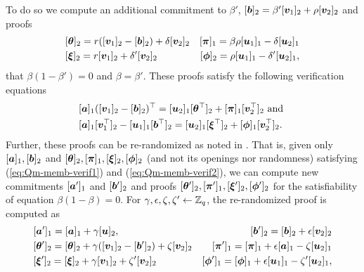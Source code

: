 To do so we compute an additional commitment to $\beta'$, $[{\boldsymbol{b}}]_2 = \beta'[{\boldsymbol{v}}_1]_2+\rho[{\boldsymbol{v}}_2]_2$ and proofs
\begin{align}
&[{\boldsymbol{\theta}}]_2 = r([{\boldsymbol{v}}_1]_2-[{\boldsymbol{b}}]_2)+\delta[{\boldsymbol{v}}_2]_2
&[{\boldsymbol{\pi}}]_1 = \beta\rho[{\boldsymbol{u}}_1]_1-\delta[{\boldsymbol{u}}_2]_1 \nonumber\\
&[{\boldsymbol{\xi}}]_2 = r[{\boldsymbol{v}}_1]_2+\delta'[{\boldsymbol{v}}_2]_2
&[{\boldsymbol{\phi}}]_2 = \rho[{\boldsymbol{u}}_1]_1 -\delta'[{\boldsymbol{u}}_2]_1,
\label{eq:Qm-memb-proofs}
\end{align}
that $\beta(1-\beta')=0$ and $\beta=\beta'$.
These proofs satisfy the following verification equations
\begin{align}
&[{\boldsymbol{a}}]_1([{\boldsymbol{v}}_1]_2-[{\boldsymbol{b}}]_2)^\top = [{\boldsymbol{u}}_2]_1[{\boldsymbol{\theta}}^\top]_2+[{\boldsymbol{\pi}}]_1[{\boldsymbol{v}}^\top_2]_2\text{ and } \label{eq:Qm-memb-verif1} \\
&[{\boldsymbol{a}}]_1[{\boldsymbol{v}}_1^\top]_2-[{\boldsymbol{u}}_1]_1[{\boldsymbol{b}}^\top]_2 = [{\boldsymbol{u}}_2]_1[{\boldsymbol{\xi}}^\top]_2 + [{\boldsymbol{\phi}}]_1[{\boldsymbol{v}}^\top_2]_2. \label{eq:Qm-memb-verif2}
\end{align}
Further, these proofs can be re-randomized as noted in \cite{C:BCCKLS09}. That is, given only $[{\boldsymbol{a}}]_1,[{\boldsymbol{b}}]_2$ and $[{\boldsymbol{\theta}}]_2,[{\boldsymbol{\pi}}]_1,[{\boldsymbol{\xi}}]_2,[{\boldsymbol{\phi}}]_2$ (and not its openings nor randomness) satisfying (\ref{eq:Qm-memb-verif1}) and (\ref{eq:Qm-memb-verif2}), we can compute new commitments $[{\boldsymbol{a}}']_1$ and $[{\boldsymbol{b}}']_2$ and proofs $[{\boldsymbol{\theta}}']_2,[{\boldsymbol{\pi}}']_1,[{\boldsymbol{\xi}}']_2,[{\boldsymbol{\phi}}']_2$ for the satisfiability of equation $\beta(1-\beta)=0$. For $\gamma,\epsilon,\zeta,\zeta'\gets\mathbb{Z}_q$, the re-randomized proof is computed as
\begin{align}
&[{\boldsymbol{a}}']_1 = [{\boldsymbol{a}}]_1 + \gamma[{\boldsymbol{u}}]_2, &[{\boldsymbol{b}}']_2 = [{\boldsymbol{b}}]_2 + \epsilon[{\boldsymbol{v}}_2]_2 \nonumber\\
&[{\boldsymbol{\theta}}']_2 = [{\boldsymbol{\theta}}]_2 + \gamma([{\boldsymbol{v}}_1]_2-[{\boldsymbol{b}}']_2)+\zeta[{\boldsymbol{v}}_2]_2
&[{\boldsymbol{\pi}}']_1 = [{\boldsymbol{\pi}}]_1 + \epsilon[{\boldsymbol{a}}]_1-\zeta[{\boldsymbol{u}}_2]_1 \nonumber\\
&[{\boldsymbol{\xi}}']_2 = [{\boldsymbol{\xi}}]_2+\gamma[{\boldsymbol{v}}_1]_2+\zeta'[{\boldsymbol{v}}_2]_2
&[{\boldsymbol{\phi}}']_1 = [{\boldsymbol{\phi}}]_1 + \epsilon[{\boldsymbol{u}}_1]_1 -\zeta'[{\boldsymbol{u}}_2]_1,
\label{eq:Qm-rerand-proofs}
\end{align}

